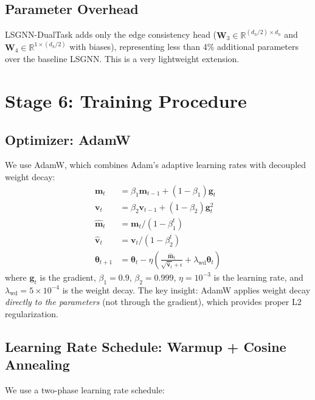 \documentclass[conference]{IEEEtran}
\newcommand{\R}{\mathbb{R}}
\newcommand{\vect}[1]{\bm{#1}}
\newcommand{\mat}[1]{\mathbf{#1}}
\begin{document}
\subsection{Parameter Overhead}

LSGNN-DualTask adds only the edge consistency head ($\mat{W}_3 \in \R^{(d_h/2) \times d_h}$ and $\mat{W}_4 \in \R^{1 \times (d_h/2)}$ with biases), representing less than 4\% additional parameters over the baseline LSGNN. This is a very lightweight extension.

\section{Stage 6: Training Procedure}
\label{sec:training}

\subsection{Optimizer: AdamW}

We use AdamW, which combines Adam's adaptive learning rates with decoupled weight decay:
\begin{align}
    \vect{m}_t &= \beta_1 \vect{m}_{t-1} + (1 - \beta_1) \vect{g}_t \\
    \vect{v}_t &= \beta_2 \vect{v}_{t-1} + (1 - \beta_2) \vect{g}_t^2 \\
    \hat{\vect{m}}_t &= \vect{m}_t / (1 - \beta_1^t) \\
    \hat{\vect{v}}_t &= \vect{v}_t / (1 - \beta_2^t) \\
    \bm{\theta}_{t+1} &= \bm{\theta}_t - \eta \left(\frac{\hat{\vect{m}}_t}{\sqrt{\hat{\vect{v}}_t} + \epsilon} + \lambda_{\text{wd}} \bm{\theta}_t\right)
\end{align}
where $\vect{g}_t$ is the gradient, $\beta_1 = 0.9$, $\beta_2 = 0.999$, $\eta = 10^{-3}$ is the learning rate, and $\lambda_{\text{wd}} = 5 \times 10^{-4}$ is the weight decay. The key insight: AdamW applies weight decay \emph{directly to the parameters} (not through the gradient), which provides proper L2 regularization.

\subsection{Learning Rate Schedule: Warmup + Cosine Annealing}

We use a two-phase learning rate schedule:
\end{document}
